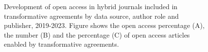 \documentclass[a4paper,man,floatsintext,longtable,noextraspace,10pt]{apa6}
\begin{document}
\begin{figure}[ht!]


\caption{\label{fig-uptake_publisher}Development of open access in
hybrid journals included in transformative agreements by data source,
author role and publisher, 2019-2023. Figure shows the open access
percentage (A), the number (B) and the percentage (C) of open access
articles enabled by transformative agreements.}

\end{figure}%
\end{document}

